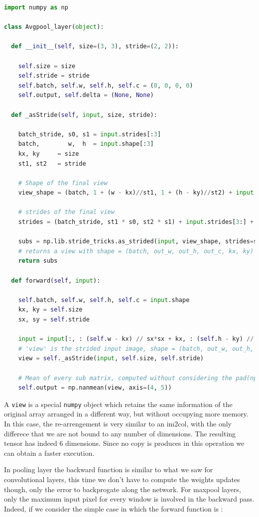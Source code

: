 \documentclass[12pt,a4paper]{report}
\begin{document}
\lstset{style=snippet}
\begin{lstlisting}[language=Python, caption=NumPyNet version of AvgPool function, label=code:py_avgpool]
import numpy as np

class Avgpool_layer(object):

  def __init__(self, size=(3, 3), stride=(2, 2)):

    self.size = size
    self.stride = stride
    self.batch, self.w, self.h, self.c = (0, 0, 0, 0)
    self.output, self.delta = (None, None)

  def _asStride(self, input, size, stride):

    batch_stride, s0, s1 = input.strides[:3]
    batch,        w,  h  = input.shape[:3]
    kx, ky     = size
    st1, st2   = stride

    # Shape of the final view
    view_shape = (batch, 1 + (w - kx)//st1, 1 + (h - ky)//st2) + input.shape[3:] + (kx, ky)

    # strides of the final view
    strides = (batch_stride, st1 * s0, st2 * s1) + input.strides[3:] + (s0, s1)

    subs = np.lib.stride_tricks.as_strided(input, view_shape, strides=strides)
    # returns a view with shape = (batch, out_w, out_h, out_c, kx, ky)
    return subs

  def forward(self, input):

    self.batch, self.w, self.h, self.c = input.shape
    kx, ky = self.size
    sx, sy = self.stride

    input = input[:, : (self.w - kx) // sx*sx + kx, : (self.h - ky) // sy*sy + ky, ...]
    # 'view' is the strided input image, shape = (batch, out_w, out_h, out_c, kx, ky)
    view = self._asStride(input, self.size, self.stride)

    # Mean of every sub matrix, computed without considering the pad(np.nan)
    self.output = np.nanmean(view, axis=(4, 5))

\end{lstlisting}

A \texttt{view} is a special \texttt{numpy} object which retains the same information of the original array arranged in a different way, but without occupying more memory. In this case, the re-arrengement is very similar to an im2col, with the only differece that we are not bound to any number of dimensions. The resulting tensor has indeed 6 dimensions.
Since no copy is produces in this operation we can obtain a faster execution.

In pooling layer the backward function is similar to what we saw for convolutional layers, this time we don't have to compute the weights updates though, only the error to backprogate along the network.
For maxpool layers, only the maximum input pixel for every window is involved in the backward pass. Indeed, if we consider the simple case in which the forward function is : 
\end{document}
